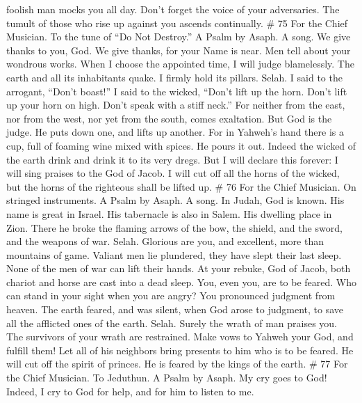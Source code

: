 foolish man mocks you all day.  Don't forget the voice of
your adversaries. The tumult of those who rise up against you ascends
continually. \# 75 For the Chief Musician. To the tune of ``Do Not
Destroy.'' A Psalm by Asaph. A song.  We give thanks to
you, God. We give thanks, for your Name is near. Men tell about your
wondrous works.  When I choose the appointed time, I will
judge blamelessly.  The earth and all its inhabitants
quake. I firmly hold its pillars. Selah.  I said to the
arrogant, ``Don't boast!'' I said to the wicked, ``Don't lift up the
horn.  Don't lift up your horn on high. Don't speak with a
stiff neck.''  For neither from the east, nor from the
west, nor yet from the south, comes exaltation.  But God
is the judge. He puts down one, and lifts up another.  For
in Yahweh's hand there is a cup, full of foaming wine mixed with spices.
He pours it out. Indeed the wicked of the earth drink and drink it to
its very dregs.  But I will declare this forever: I will
sing praises to the God of Jacob.  I will cut off all the
horns of the wicked, but the horns of the righteous shall be lifted up.
\# 76 For the Chief Musician. On stringed instruments. A Psalm by Asaph.
A song.  In Judah, God is known. His name is great in
Israel.  His tabernacle is also in Salem. His dwelling
place in Zion.  There he broke the flaming arrows of the
bow, the shield, and the sword, and the weapons of war. Selah.
 Glorious are you, and excellent, more than mountains of
game.  Valiant men lie plundered, they have slept their
last sleep. None of the men of war can lift their hands. 
At your rebuke, God of Jacob, both chariot and horse are cast into a
dead sleep.  You, even you, are to be feared. Who can
stand in your sight when you are angry?  You pronounced
judgment from heaven. The earth feared, and was silent, 
when God arose to judgment, to save all the afflicted ones of the earth.
Selah.  Surely the wrath of man praises you. The
survivors of your wrath are restrained.  Make vows to
Yahweh your God, and fulfill them! Let all of his neighbors bring
presents to him who is to be feared.  He will cut off the
spirit of princes. He is feared by the kings of the earth. \# 77 For the
Chief Musician. To Jeduthun. A Psalm by Asaph.  My cry
goes to God! Indeed, I cry to God for help, and for him to listen to me.
